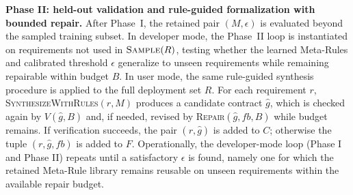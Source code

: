 \documentclass[conference]{IEEEtran}
\begin{document}
\textbf{Phase II: held-out validation and rule-guided formalization with bounded repair.}
After Phase~I, the retained pair $(M,\epsilon)$ is evaluated beyond the sampled training subset. In developer mode, the Phase~II loop is instantiated on requirements not used in $\textsc{Sample}(R)$, testing whether the learned Meta-Rules and calibrated threshold $\epsilon$ generalize to unseen requirements while remaining repairable within budget $B$. In user mode, the same rule-guided synthesis procedure is applied to the full deployment set $R$. For each requirement $r$, \textsc{SynthesizeWithRules}$(r,M)$ produces a candidate contract $\hat{g}$, which is checked again by $V(\hat{g},B)$ and, if needed, revised by \textsc{Repair}$(\hat{g},fb,B)$ while budget remains. If verification succeeds, the pair $(r,\hat{g})$ is added to $C$; otherwise the tuple $(r,\hat{g},fb)$ is added to $F$. Operationally, the developer-mode loop (Phase I and Phase II) repeats until a satisfactory $\epsilon$ is found, namely one for which the retained Meta-Rule library remains reusable on unseen requirements within the available repair budget.
\end{document}
